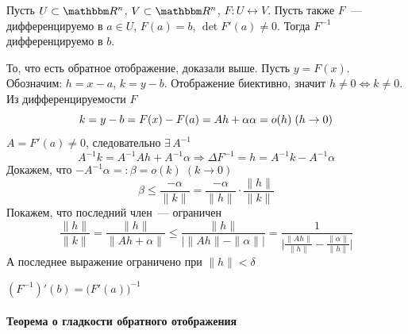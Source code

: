 \documentclass[12pt,timbord]{../../../notes}
\begin{document}
\begin{thrm}[о дифференцируемости $F^{-1}$]\label{thrm:diffspace::invdiff}
  Пусть $U \subset \R^n$, $V \subset \R^n$, $F\colon U \leftrightarrow V$. Пусть также
  $F$~--- дифференцируемо в $a\in U$, $F(a) = b$,  $\det F'(a) \neq 0$. 
  Тогда $F^{-1}$ дифференцируемо в $b$.
\end{thrm}
\begin{ittproof}
  То, что есть обратное отображение, доказали выше. Пусть $y=F(x)$. Обозначим: $h= x-a$, $k=y-b$.
  Отображение биективно, значит $h\neq 0 \Leftrightarrow k \neq 0$.
  Из дифференцируемости $F$
  \[
    k = y - b = F(x) - F(a) = A h + \alpha \\
    \alpha = o(h) \; (h\to 0)
  \]
  $A = F'(a) \neq 0$, следовательно $\exists\, A^{-1}$
  \[
    A^{-1} k = A^{-1}Ah + A^{-1}\alpha \Rightarrow \Delta F^{-1} = h = A^{-1} k - A^{-1} \alpha
  \]
  Докажем, что $-A^{-1} \alpha =: \beta = o(k) \; (k\to 0) $
  \[
    \beta \leqslant \frac{-\alpha}{\|k\|} = \frac{-\alpha}{\|h\|}\cdot \frac{\|h\|}{\|k\|}  
  \]
  Покажем, что последний член~--- ограничен
  \[
    \frac{\|h\|}{\|k\|} = \frac{\|h\|}{\|A h + \alpha\|} 
    \leqslant \frac{\|h\|}{\big|\|Ah\|- \|\alpha\|\big|}
    = \frac{1}{\big|\frac{\|Ah\|}{\|h\|} - \frac{\|\alpha\|}{\|h\|}\big|}  
  \]
  А последнее выражение ограничено при $\|h\| < \delta$

\end{ittproof}

\begin{cor*}
  $\displaystyle (F^{-1})'(b) = \bigl(F'(a)\bigr)^{-1}$
\end{cor*}

\paragraph{Теорема о гладкости обратного отображения}
\label{par:diffspace::invsmooth}
\end{document}
